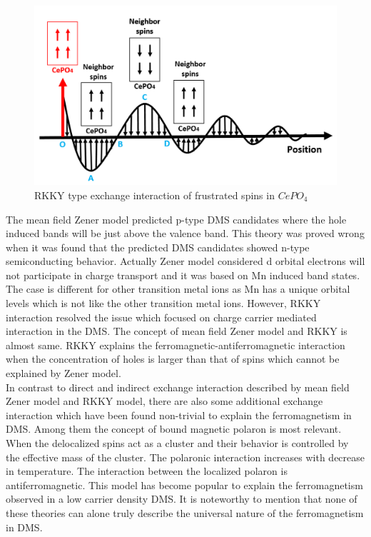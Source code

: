 \documentclass[main.tex]{subfiles}
\begin{document}
\begin{figure}[!htb]
	\centering
	\includegraphics[width=0.8\linewidth]{rkky}
	\caption{RKKY type exchange interaction of frustrated spins in $CePO_{4}$ \cite{al2018effect}}
	\label{fig:TEM_PT}
\end{figure}
\FloatBarrier

The mean field Zener model predicted p-type DMS candidates where the hole induced bands will be just above the valence band. This theory was proved wrong when it was found that the predicted DMS candidates showed n-type semiconducting behavior. Actually Zener model considered d orbital electrons will not participate in charge transport and it was based on Mn induced band states. The case is different for other transition metal ions as Mn has a unique orbital levels which is not like the other transition metal ions. However, RKKY interaction resolved the issue which focused on charge carrier mediated interaction in the DMS. The concept of mean field Zener model and RKKY is almost same. RKKY explains the ferromagnetic-antiferromagnetic interaction when the concentration of holes is larger than that of spins which cannot be explained by Zener model. \\

In contrast to direct and indirect exchange interaction described by mean field Zener model and RKKY model, there are also some additional exchange interaction which have been found non-trivial to explain the ferromagnetism in DMS. Among them the concept of bound magnetic polaron is most relevant. When the delocalized spins act as a cluster and their behavior is controlled by the effective mass of the cluster. The polaronic interaction increases with decrease in temperature. The interaction between the localized polaron is antiferromagnetic. This model has become popular to explain the ferromagnetism observed in a low carrier density DMS. It is noteworthy to mention that none of these theories can alone truly describe the universal nature of the ferromagnetism in DMS. 
\end{document}
